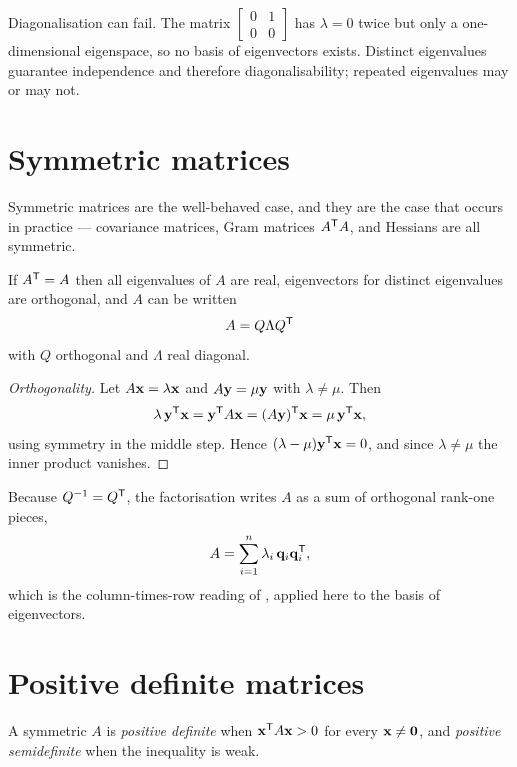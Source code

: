 
Diagonalisation can fail. The matrix \(\begin{bmatrix}0&1\\0&0\end{bmatrix}\)
has \(\lambda=0\) twice but only a one-dimensional eigenspace, so no basis of
eigenvectors exists. Distinct eigenvalues guarantee independence and therefore
diagonalisability; repeated eigenvalues may or may not.

\section{Symmetric matrices}

Symmetric matrices are the well-behaved case, and they are the case that occurs
in practice --- covariance matrices, Gram matrices \(A^{\mathsf{T}} A\), and Hessians are
all symmetric.

\begin{theorem}
If \(A^{\mathsf{T}}=A\) then all eigenvalues of \(A\) are real, eigenvectors for distinct
eigenvalues are orthogonal, and \(A\) can be written
\[
	A=Q\Lambda Q^{\mathsf{T}}
\]
with \(Q\) orthogonal and \(\Lambda\) real diagonal.
\end{theorem}

\begin{proof}[Orthogonality]
Let \(A\mathbf{x}=\lambda\mathbf{x}\) and \(A\mathbf{y}=\mu\mathbf{y}\) with
\(\lambda\neq\mu\). Then
\[
	\lambda\,\mathbf{y}^{\mathsf{T}}\mathbf{x}=\mathbf{y}^{\mathsf{T}} A\mathbf{x}
	=(A\mathbf{y})^{\mathsf{T}}\mathbf{x}=\mu\,\mathbf{y}^{\mathsf{T}}\mathbf{x},
\]
using symmetry in the middle step. Hence
\((\lambda-\mu)\mathbf{y}^{\mathsf{T}}\mathbf{x}=0\), and since \(\lambda\neq\mu\) the inner
product vanishes.
\end{proof}

Because \(Q^{-1}=Q^{\mathsf{T}}\), the factorisation writes \(A\) as a sum of orthogonal
rank-one pieces,
\[
	A=\sum_{i=1}^{n}\lambda_i\,\mathbf{q}_i\mathbf{q}_i^{\mathsf{T}} ,
\]
which is the column-times-row reading of , applied here to
the basis of eigenvectors.

\section{Positive definite matrices}

\begin{definition}
A symmetric \(A\) is \emph{positive definite} when \(\mathbf{x}^{\mathsf{T}} A\mathbf{x}>0\)
for every \(\mathbf{x}\neq\mathbf{0}\), and \emph{positive semidefinite} when the
inequality is weak.
\end{definition}

